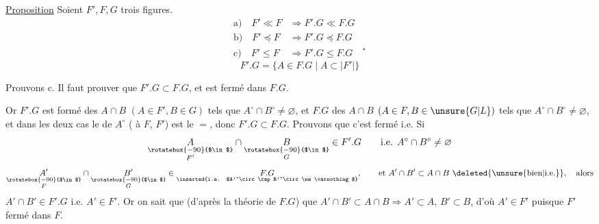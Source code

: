 \uline{Proposition} Soient $F',F,G$ trois figures.
\[
\begin{aligned}
 \text{a)}\quad F'\ll F&\Longrightarrow F'.G\ll F.G\\
 \text{b)}\quad F'\preceq F&\Longrightarrow F'.G\preceq F.G\\
 \text{c)}\quad F'\leq F&\Longrightarrow F'.G\leq F.G\quad{}^{*}
\end{aligned}
\]
\[
 F'.G=\{A\in F.G\mid A\subset |F'|\}
\]

Prouvons c. Il faut prouver que  $F'.G\subset F.G$, et est fermé dans $F.G$.

 Or $F'.G$ est formé des $A\cap B$ $(A\in F',B\in G)$ tels que $A^\circ\cap B^\circ\ne\varnothing$, et $F.G$ des $A\cap B$ $(A\in F,B\in \unsure{G|L})$ tels que $A^\circ\cap B^\circ\ne\varnothing$, et dans les deux cas le  de $A^\circ$ ( à $F$,  $F'$) est le $=$, donc $F'.G\subset F.G$. Prouvons que c'est fermé i.e.
Si 
\[
 \underset{\substack{\rotatebox{-90}{$\in$}\\ F'}}{A}\cap
 \underset{\substack{\rotatebox{-90}{$\in$}\\ G}}{B}\in F'.G\qquad
 \text{i.e. } A^\circ\cap B^\circ\ne\varnothing
\]
\[
 \underset{\substack{\rotatebox{-90}{$\in$}\\ F}}{A'}\cap
 \underset{\substack{\rotatebox{-90}{$\in$}\\ G}}{B'}\in\underset{\text{\inserted{i.e. $A'^\circ\cap B'^\circ\ne\varnothing$}}}{F.G},\qquad
 \text{et } A'\cap B'\subset A\cap B\ \deleted{\unsure{\text{bien}|\text{i.e.}}},\quad\text{alors}
\]
$A'\cap B'\in F'.G$ i.e. $A'\in F'$. Or on sait que (d'après la théorie de $F.G$) que $A'\cap B'\subset A\cap B\Longrightarrow A'\subset A$, $B'\subset B$, d'où $A'\in F'$ puisque $F'$ fermé dans $F$.

